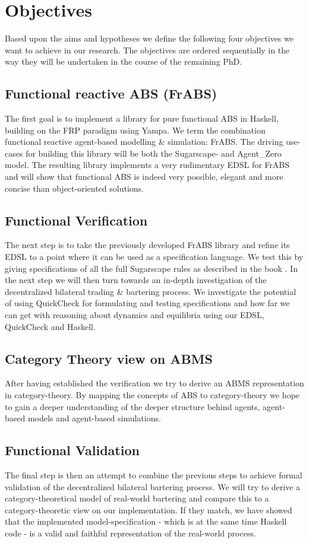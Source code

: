 \section{Objectives}
Based upon the aims and hypotheses we define the following four objectives we want to achieve in our research. The objectives are ordered sequentially in the way they will be undertaken in the course of the remaining PhD.

\subsection{Functional reactive ABS (FrABS)}
The first goal is to implement a library for pure functional ABS in Haskell, building on the FRP paradigm using Yampa. We term the combination functional reactive agent-based modelling \& simulation: FrABS. The driving use-cases for building this library will be both the Sugarscape- and Agent\_Zero model. The resulting library implements a very rudimentary EDSL for FrABS and will show that functional ABS is indeed very possible, elegant and more concise than object-oriented solutions.

\subsection{Functional Verification}
The next step is to take the previously developed FrABS library and refine its EDSL to a point where it can be used as a specification language. We test this by giving specifications of all the full Sugarscape rules as described in the book \cite{epstein_growing_1996}. In the next step we will then turn towards an in-depth investigation of the decentralized bilateral trading \& bartering process. We investigate the potential of using QuickCheck for formulating and testing specifications and how far we can get with reasoning about dynamics and equilibria using our EDSL, QuickCheck and Haskell.

\subsection{Category Theory view on ABMS}
After having established the verification we try to derive an ABMS representation in category-theory. By mapping the concepts of ABS to category-theory we hope to gain a deeper understanding of the deeper structure behind agents, agent-based models and agent-based simulations.

\subsection{Functional Validation}
The final step is then an attempt to combine the previous steps to achieve formal validation of the decentralized bilateral bartering process. We will try to derive a category-theoretical model of real-world bartering and compare this to a category-theoretic view on our implementation. If they match, we have showed that the implemented model-specification - which is at the same time Haskell code - is a valid and faithful representation of the real-world process.

